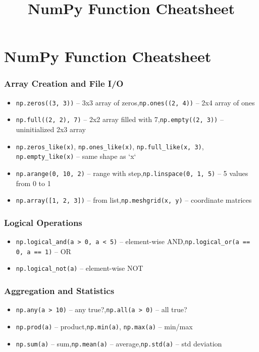 \documentclass{article}
\title{NumPy Function Cheatsheet}
\author{}
\date{}
\begin{document}
\scriptsize

\section*{NumPy Function Cheatsheet}

\subsubsection*{Array Creation and File I/O}
\begin{itemize}
    \item \texttt{np.zeros((3, 3))} -- 3x3 array of zeros,\quad \texttt{np.ones((2, 4))} -- 2x4 array of ones
    \item \texttt{np.full((2, 2), 7)} -- 2x2 array filled with 7,\quad \texttt{np.empty((2, 3))} -- uninitialized 2x3 array
    \item \texttt{np.zeros\_like(x)}, \texttt{np.ones\_like(x)}, \texttt{np.full\_like(x, 3)}, \texttt{np.empty\_like(x)} -- same shape as `x`
    \item \texttt{np.arange(0, 10, 2)} -- range with step,\quad \texttt{np.linspace(0, 1, 5)} -- 5 values from 0 to 1
    \item \texttt{np.array([1, 2, 3])} -- from list,\quad \texttt{np.meshgrid(x, y)} -- coordinate matrices
\end{itemize}

\subsubsection*{Logical Operations}
\begin{itemize}
    \item \texttt{np.logical\_and(a > 0, a < 5)} -- element-wise AND,\quad \texttt{np.logical\_or(a == 0, a == 1)} -- OR
    \item \texttt{np.logical\_not(a)} -- element-wise NOT
\end{itemize}

\subsubsection*{Aggregation and Statistics}
\begin{itemize}
    \item \texttt{np.any(a > 10)} -- any true?,\quad \texttt{np.all(a > 0)} -- all true?
    \item \texttt{np.prod(a)} -- product,\quad \texttt{np.min(a)}, \texttt{np.max(a)} -- min/max
    \item \texttt{np.sum(a)} -- sum,\quad \texttt{np.mean(a)} -- average,\quad \texttt{np.std(a)} -- std deviation
\end{itemize}
\end{document}
